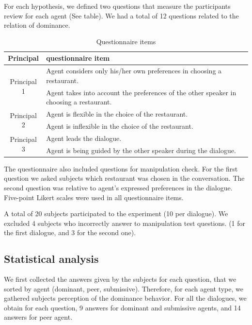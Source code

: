\documentclass{llncs}
\begin{document}
For each hypothesis, we defined two questions that measure the participants review for each agent (See table). We had a total of 12 questions related to the relation of dominance.

\begin{table}[t]
	\centering
	\begin{tabular}{|c|l|} 
		\hline
		Principal & questionnaire item\\
		\hline
		 \multirow{2}{*}{Principal 1} & Agent considers only his/her own preferences in choosing a restaurant. \\ \cline{2-2}
		 							  & Agent takes into account the preferences of the other speaker in choosing a restaurant. \\
		\hline	
		\multirow{2}{*}{Principal 2} & Agent is flexible in the choice of the restaurant. \\ \cline{2-2}
									 & Agent is inflexible in the choice of the restaurant. \\ 
		\hline
		\multirow{2}{*}{Principal 3} & Agent leads the dialogue. \\ \cline{2-2}
									 &  Agent is being guided by the other speaker during the dialogue.\\ 
		\hline
	\end{tabular} 
	\caption{\label{table2} Questionnaire items}
\end{table}

The questionnaire also included  questions for manipulation check. For the first question we asked subjects which restaurant was chosen in the conversation. The second question was relative to agent's expressed preferences in the dialogue. Five-point Likert scales were used in all questionnaire items.

A total of 20 subjects participated to the experiment (10 per dialogue). We excluded 4 subjects who incorrectly answer to manipulation test questions. (1 for the first dialogue, and 3 for the second one).
\subsection{Statistical analysis}

We first collected the answers given by the subjects for each question, that we sorted by agent (dominant, peer, submissive). Therefore, for each agent type, we gathered subjects perception of the dominance behavior. For all the dialogues, we obtain for each question, 9 answers for dominant and submissive agents, and 14 answers for peer agent. 
\end{document}
